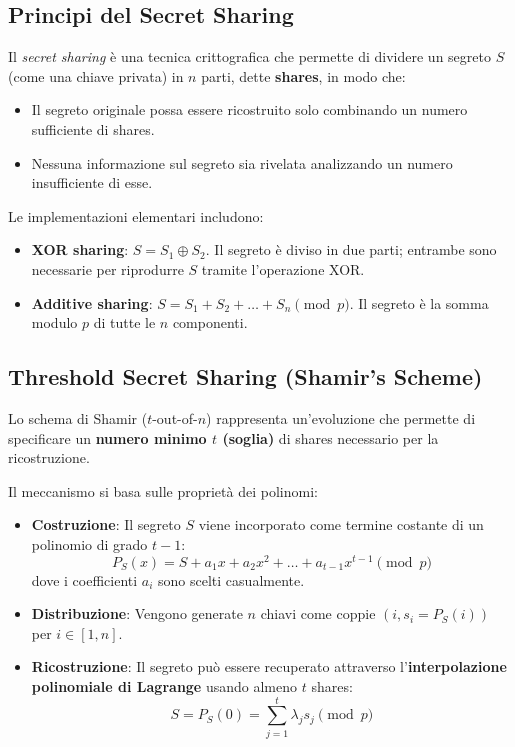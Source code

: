 \subsection{Principi del Secret Sharing}
Il \textit{secret sharing} è una tecnica crittografica che permette di dividere un segreto $S$ (come una chiave privata) in $n$ parti, dette \textbf{shares}, in modo che:
\begin{itemize}
    \item Il segreto originale possa essere ricostruito solo combinando un numero sufficiente di shares.
    \item Nessuna informazione sul segreto sia rivelata analizzando un numero insufficiente di esse.
\end{itemize}

Le implementazioni elementari includono:
\begin{itemize}
    \item \textbf{XOR sharing}: $S = S_1 \oplus S_2$. Il segreto è diviso in due parti; entrambe sono necessarie per riprodurre $S$ tramite l'operazione XOR.
    \item \textbf{Additive sharing}: $S = S_1 + S_2 + \dots + S_n \pmod p$. Il segreto è la somma modulo $p$ di tutte le $n$ componenti.
\end{itemize}

\subsection{Threshold Secret Sharing (Shamir's Scheme)}
Lo schema di Shamir ($t$-out-of-$n$) rappresenta un'evoluzione che permette di specificare un \textbf{numero minimo $t$ (soglia)} di shares necessario per la ricostruzione.

Il meccanismo si basa sulle proprietà dei polinomi:
\begin{itemize}
    \item \textbf{Costruzione}: Il segreto $S$ viene incorporato come termine costante di un polinomio di grado $t-1$:
    \[ P_S(x) = S + a_1x + a_2x^2 + \dots + a_{t-1}x^{t-1} \pmod p \]
    dove i coefficienti $a_i$ sono scelti casualmente.
    \item \textbf{Distribuzione}: Vengono generate $n$ chiavi come coppie $(i, s_i = P_S(i))$ per $i \in [1, n]$.
    \item \textbf{Ricostruzione}: Il segreto può essere recuperato attraverso l'\textbf{interpolazione polinomiale di Lagrange} usando almeno $t$ shares:
    \[ S = P_S(0) = \sum_{j=1}^{t} \lambda_j s_j \pmod p \]
\end{itemize}

